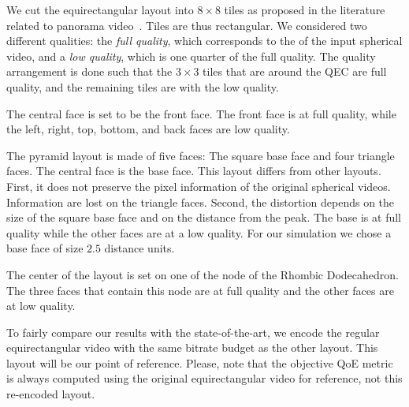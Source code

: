We cut the equirectangular layout into
$8\times8$ tiles as proposed in the literature related to panorama
video~\cite{gaddam_tiling_2015}. Tiles are thus rectangular. We
considered two different qualities: the \emph{full quality}, which
corresponds to the  of the input spherical video, and
a \emph{low quality}, which is one quarter of the full quality. The
quality arrangement is done such that the $3\times3$
tiles that are around the \ac{QEC} are full quality, and the
remaining tiles are with the low quality.

 The central face is set to be the front face. The
front face is at full quality, while the left, right, top, bottom, and
back faces are low quality.

 The pyramid layout is made of five faces: The square
base face and four triangle faces. The central face is the base face.
This layout differs from other layouts. First, it does not preserve
the pixel information of the original spherical videos. Information
are lost on the triangle faces. Second, the distortion depends on the
size of the square base face and on the distance from the peak.  The
base is at full quality while the other faces are at a low quality.
For our simulation we chose a base face of size $2.5$ distance units.

 The center of the layout is set on one of
the node of the Rhombic Dodecahedron. The three faces that contain
this node are at full quality and the other faces are at low quality.

 To fairly compare our results with the
state-of-the-art, we encode the regular equirectangular video with the
same bitrate budget as the other layout. This layout will be our point
of reference. Please, note that the objective \ac{QoE} metric is
always computed using the original equirectangular video for
reference, not this re-encoded layout.


